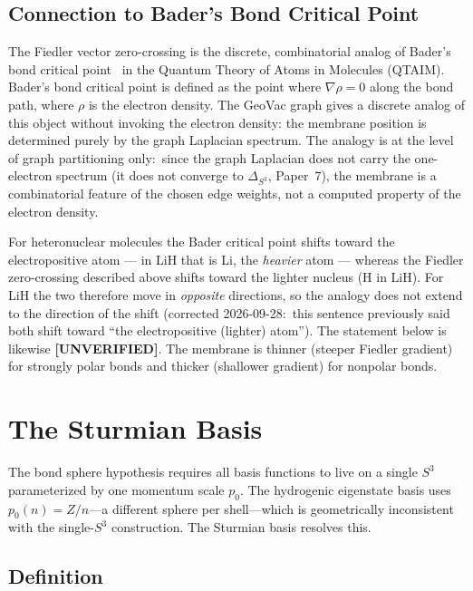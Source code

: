 \documentclass[aps,pra,twocolumn,superscriptaddress,longbibliography]{revtex4-2}
\theoremstyle{remark}
\theoremstyle{plain}
\begin{document}
\subsection{Connection to Bader's Bond Critical Point}

The Fiedler vector zero-crossing is the discrete, combinatorial analog
of Bader's bond critical point~\cite{Bader1990} in the Quantum Theory
of Atoms in Molecules (QTAIM).  Bader's bond critical point is defined
as the point where $\nabla\rho = 0$ along the bond path, where $\rho$
is the electron density.  The GeoVac graph gives a discrete analog of this object
without invoking the electron density: the membrane position is
determined purely by the graph Laplacian spectrum.  The analogy is at the
level of graph partitioning only:\ since the graph Laplacian does not
carry the one-electron spectrum (it does not converge to $\Delta_{S^3}$,
Paper~7), the membrane is a combinatorial feature of the chosen edge
weights, not a computed property of the electron density.

For heteronuclear molecules the Bader critical point shifts toward the
electropositive atom --- in LiH that is Li, the \emph{heavier} atom ---
whereas the Fiedler zero-crossing described above shifts toward the
lighter nucleus (H in LiH).  For LiH the two therefore move in
\emph{opposite} directions, so the analogy does not extend to the
direction of the shift (corrected 2026-09-28:\ this sentence previously
said both shift toward ``the electropositive (lighter) atom'').  The
statement below is likewise \textbf{[UNVERIFIED]}.
The membrane is thinner (steeper Fiedler gradient) for strongly polar
bonds and thicker (shallower gradient) for nonpolar bonds.


\section{The Sturmian Basis}
\label{sec:sturmian}

The bond sphere hypothesis requires all basis functions to live on a
single $S^3$ parameterized by one momentum scale $p_0$.  The
hydrogenic eigenstate basis uses $p_0(n) = Z/n$---a different sphere
per shell---which is geometrically inconsistent with the single-$S^3$
construction.  The Sturmian basis resolves this.

\subsection{Definition}
\end{document}

